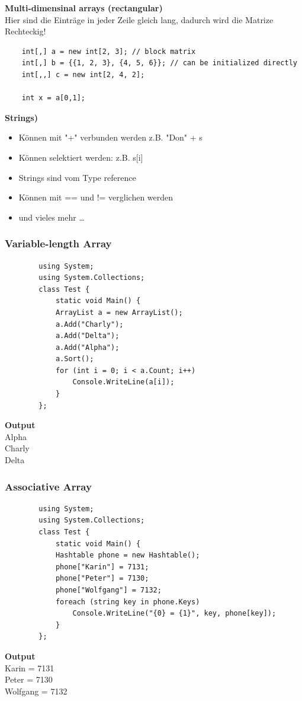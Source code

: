 \textbf{Multi-dimensinal arrays (rectangular)}\\
Hier sind die Einträge in jeder Zeile gleich lang, dadurch wird die Matrize Rechteckig!
\begin{lstlisting}
	int[,] a = new int[2, 3]; // block matrix 
	int[,] b = {{1, 2, 3}, {4, 5, 6}}; // can be initialized directly 
	int[,,] c = new int[2, 4, 2];
	
	int x = a[0,1];
\end{lstlisting}

\textbf{Strings)}\\
\begin{itemize}
	\item Können mit "+" verbunden werden z.B. "Don" + s
	\item Können selektiert werden: z.B. s[i]
	\item Strings sind vom Type reference
	\item Können mit == und != verglichen werden
	\item und vieles mehr \ldots
\end{itemize}

\subsubsection{Variable-length Array}
\begin{multicols}{2}

	\begin{lstlisting}
		using System;
		using System.Collections;
		class Test {
			static void Main() {
			ArrayList a = new ArrayList();
			a.Add("Charly");
			a.Add("Delta");
			a.Add("Alpha");
			a.Sort();
			for (int i = 0; i < a.Count; i++)
				Console.WriteLine(a[i]);
			}
		};
	\end{lstlisting}
	\columnbreak
	
	\textbf{Output}\\
		Alpha\\
		Charly\\
		Delta\\
\end{multicols}


\subsubsection{Associative Array}
\begin{multicols}{2}

	\begin{lstlisting}
		using System;
		using System.Collections;
		class Test {
			static void Main() {
			Hashtable phone = new Hashtable();
			phone["Karin"] = 7131;
			phone["Peter"] = 7130;
			phone["Wolfgang"] = 7132;
			foreach (string key in phone.Keys)
				Console.WriteLine("{0} = {1}", key, phone[key]);
			}
		};
	\end{lstlisting}
	\columnbreak
	
	\textbf{Output}\\
		Karin = 7131\\
		Peter = 7130\\
		Wolfgang = 7132\\
\end{multicols}


